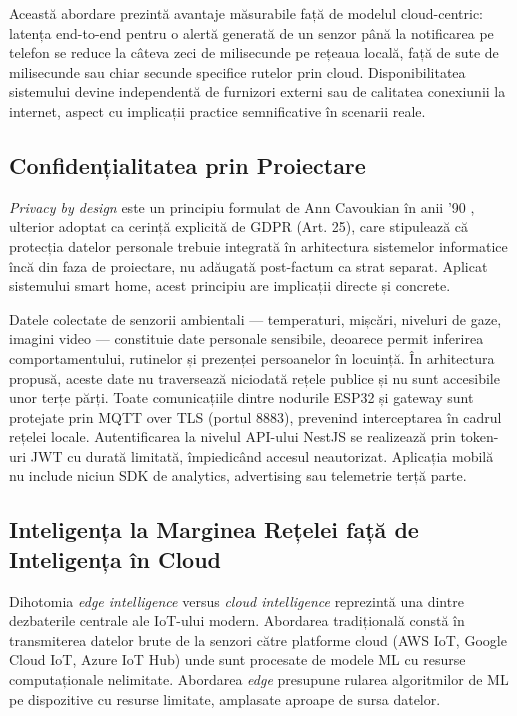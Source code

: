 \documentclass[12pt, twoside, a4paper]{report}
\begin{document}
Această abordare prezintă avantaje măsurabile față de modelul cloud-centric:
latența end-to-end pentru o alertă generată de un senzor până la notificarea pe
telefon se reduce la câteva zeci de milisecunde pe rețeaua locală, față de sute de
milisecunde sau chiar secunde specifice rutelor prin cloud. Disponibilitatea
sistemului devine independentă de furnizori externi sau de calitatea conexiunii la
internet, aspect cu implicații practice semnificative în scenarii reale.

\subsection{Confidențialitatea prin Proiectare}

\textit{Privacy by design} este un principiu formulat de Ann Cavoukian în anii '90
\cite{cavoukian2009}, ulterior adoptat ca cerință explicită de GDPR (Art. 25), care
stipulează că protecția datelor personale trebuie integrată în arhitectura sistemelor
informatice încă din faza de proiectare, nu adăugată post-factum ca strat separat.
Aplicat sistemului smart home, acest principiu are implicații directe și concrete.

Datele colectate de senzorii ambientali --- temperaturi, mișcări, niveluri de gaze,
imagini video --- constituie date personale sensibile, deoarece permit inferirea
comportamentului, rutinelor și prezenței persoanelor în locuință. În arhitectura
propusă, aceste date nu traversează niciodată rețele publice și nu sunt accesibile
unor terțe părți. Toate comunicațiile dintre nodurile ESP32 și gateway sunt protejate
prin MQTT over TLS (portul 8883), prevenind interceptarea în cadrul rețelei locale.
Autentificarea la nivelul API-ului NestJS se realizează prin token-uri JWT cu durată
limitată, împiedicând accesul neautorizat. Aplicația mobilă nu include niciun SDK
de analytics, advertising sau telemetrie terță parte.

\subsection{Inteligența la Marginea Rețelei față de Inteligența în Cloud}

Dihotomia \textit{edge intelligence} versus \textit{cloud intelligence} reprezintă
una dintre dezbaterile centrale ale IoT-ului modern. Abordarea tradițională constă
în transmiterea datelor brute de la senzori către platforme cloud (AWS IoT, Google
Cloud IoT, Azure IoT Hub) unde sunt procesate de modele ML cu resurse computaționale
nelimitate. Abordarea \textit{edge} presupune rularea algoritmilor de ML pe dispozitive
cu resurse limitate, amplasate aproape de sursa datelor.
\end{document}
